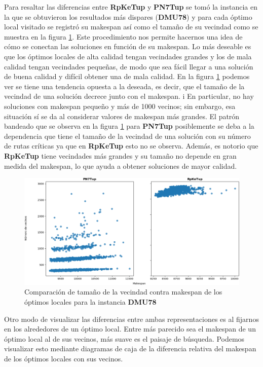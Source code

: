 Para resaltar las diferencias entre \textbf{RpKeTup} y \textbf{PN7Tup} se tomó la instancia en la que se obtuvieron los resultados más dispares 
(\textbf{DMU78}) y para cada óptimo local visitado se registró su makespan así como el tamaño de su vecindad como se muestra en la figura \ref{fig:mattgraph}. 
%
Este procedimiento nos permite hacernos una idea de cómo se conectan las soluciones en función de su makespan. 
%
Lo más deseable es que los óptimos locales de alta calidad tengan vecindades grandes y los de mala calidad tengan vecindades pequeñas, 
de modo que sea fácil llegar a una solución de buena calidad y difícil obtener una de mala calidad. 
%
En la figura \ref{fig:mattgraph} podemos ver se tiene una tendencia opuesta a la deseada, es decir, que el tamaño de la vecindad de una 
solución decrece junto con el makespan. i
%
En particular, no hay soluciones con makespan pequeño y más de 1000 vecinos; 
%
sin embargo, esa situación sí se da al considerar valores de makespan más grandes.
%
El patrón bandeado que se observa en la figura \ref{fig:mattgraph} para \textbf{PN7Tup} posiblemente se deba a la dependencia que tiene el 
tamaño de la vecindad de una solución con su número de rutas críticas ya que en \textbf{RpKeTup} esto no se observa.
%
Además, es notorio que \textbf{RpKeTup} tiene vecindades más grandes y su tamaño no depende en gran medida del makespan, lo que ayuda a obtener soluciones
de mayor calidad.

\begin{figure}[hbtp]
    \includegraphics[scale=.6]{Imagenes/compvec78.png}
    \caption{Comparación de tamaño de la vecindad contra makespan de los óptimos locales para la instancia \textbf{DMU78} }
    \label{fig:mattgraph}
\end{figure}

Otro modo de visualizar las diferencias entre ambas representaciones es al fijarnos en los alrededores de un óptimo local. 
%
Entre más parecido sea el makespan de un óptimo local al de sus vecinos, más suave es el paisaje de búsqueda. Podemos visualizar esto mediante diagramas de caja de 
la diferencia relativa del makespan de los óptimos locales con sus vecinos. 

